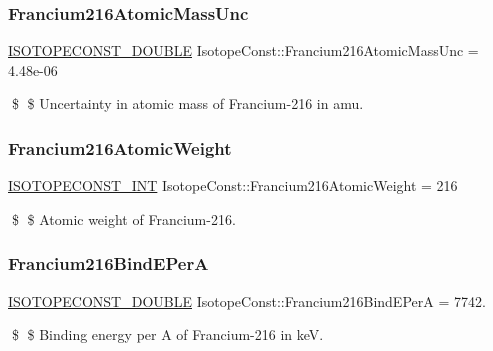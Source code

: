 \subsubsection{\texorpdfstring{Francium216\+Atomic\+Mass\+Unc}{Francium216AtomicMassUnc}}
{\footnotesize\ttfamily \mbox{\hyperlink{group___isotope_const-_macros_ga8f45a7272ce02c0b4c65c44636ed719a}{I\+S\+O\+T\+O\+P\+E\+C\+O\+N\+S\+T\+\_\+\+D\+O\+U\+B\+LE}} Isotope\+Const\+::\+Francium216\+Atomic\+Mass\+Unc = 4.\+48e-\/06}

\$ \$ Uncertainty in atomic mass of Francium-\/216 in amu. \mbox{\label{group___isotope_const-_francium-_fr216_ga412be196b659e2fc49d521ec29c4723b}} 
\subsubsection{\texorpdfstring{Francium216\+Atomic\+Weight}{Francium216AtomicWeight}}
{\footnotesize\ttfamily \mbox{\hyperlink{group___isotope_const-_macros_ga5f18360b3e99483a35c32d789e62621c}{I\+S\+O\+T\+O\+P\+E\+C\+O\+N\+S\+T\+\_\+\+I\+NT}} Isotope\+Const\+::\+Francium216\+Atomic\+Weight = 216}

\$ \$ Atomic weight of Francium-\/216. \mbox{\label{group___isotope_const-_francium-_fr216_ga4034f25525f05e9f7c8a31e9c99286e2}} 
\subsubsection{\texorpdfstring{Francium216\+Bind\+E\+PerA}{Francium216BindEPerA}}
{\footnotesize\ttfamily \mbox{\hyperlink{group___isotope_const-_macros_ga8f45a7272ce02c0b4c65c44636ed719a}{I\+S\+O\+T\+O\+P\+E\+C\+O\+N\+S\+T\+\_\+\+D\+O\+U\+B\+LE}} Isotope\+Const\+::\+Francium216\+Bind\+E\+PerA = 7742.}

\$ \$ Binding energy per A of Francium-\/216 in keV. \mbox{\label{group___isotope_const-_francium-_fr216_gaf406e5d9bdac70c79e883a6689fee098}} 
